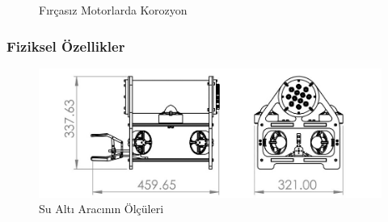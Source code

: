 \documentclass[12pt]{article}
\begin{document}
\begin{figure}%
    \centering
    \qquad
    \caption{Fırçasız Motorlarda Korozyon}%
    \label{fig:korozyon}%
\end{figure}



\newpage
\subsubsection{Fiziksel Özellikler}

\begin{figure}[hbt!]
\centering
\includegraphics[width=1\linewidth]{images/specs.jpg}
\caption{Su Altı Aracının Ölçüleri}
\label{fig:technicaldrawing}
\end{figure}
\end{document}
